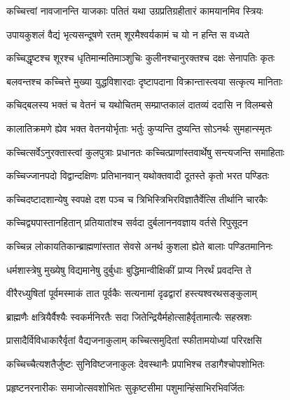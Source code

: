 \twolineshloka
{कच्चित्त्वां नावजानन्ति याजकाः पतितं यथा}
{उग्रप्रतिग्रहीतारं कामयानमिव स्त्रियः} %

\twolineshloka
{उपायकुशलं वैद्यं भृत्यसन्दूषणे रतम्}
{शूरमैश्वर्यकामं च यो न हन्ति स वध्यते} %

\twolineshloka
{कच्चिद्धृष्टश्च शूरश्च धृतिमान्मतिमाञ्शुचिः}
{कुलीनश्चानुरक्तश्च दक्षः सेनापतिः कृतः} %

\twolineshloka
{बलवन्तश्च कच्चित्ते मुख्या युद्धविशारदाः}
{दृष्टापदाना विक्रान्तास्त्वया सत्कृत्य मानिताः} %

\twolineshloka
{कचिद्बलस्य भक्तं च वेतनं च यथोचितम्}
{सम्प्राप्तकालं दातव्यं ददासि न विलम्बसे} %

\twolineshloka
{कालातिक्रमणे ह्येव भक्त वेतनयोर्भृताः}
{भर्तुः कुप्यन्ति दुष्यन्ति सोऽनर्थः सुमहान्स्मृतः} %

\twolineshloka
{कच्चित्सर्वेऽनुरक्तास्त्वां कुलपुत्राः प्रधानतः}
{कच्चित्प्राणांस्तवार्थेषु सन्त्यजन्ति समाहिताः} %

\twolineshloka
{कच्चिज्जानपदो विद्वान्दक्षिणः प्रतिभानवान्}
{यथोक्तवादी दूतस्ते कृतो भरत पण्डितः} %

\twolineshloka
{कच्चिदष्टादशान्येषु स्वपक्षे दश पञ्च च}
{त्रिभिस्त्रिभिरविज्ञातैर्वेत्सि तीर्थानि चारकैः} %

\twolineshloka
{कच्चिद्व्यपास्तानहितान् प्रतियातांश्च सर्वदा}
{दुर्बलाननवज्ञाय वर्तसे रिपुसूदन} %

\twolineshloka
{कच्चिन्न लोकायतिकान्ब्राह्मणांस्तात सेवसे}
{अनर्थ कुशला ह्येते बालाः पण्डितमानिनः} %

\twolineshloka
{धर्मशास्त्रेषु मुख्येषु विद्यमानेषु दुर्बुधाः}
{बुद्धिमान्वीक्षिकीं प्राप्य निरर्थं प्रवदन्ति ते} %

\twolineshloka
{वीरैरध्युषितां पूर्वमस्माकं तात पूर्वकैः}
{सत्यनामां दृढद्वारां हस्त्यश्वरथसङ्कुलाम्} %

\twolineshloka
{ब्राह्मणैः क्षत्रियैर्वैश्यैः स्वकर्मनिरतैः सदा}
{जितेन्द्रियैर्महोत्साहैर्वृतामात्यैः सहस्रशः} %

\twolineshloka
{प्रासादैर्विविधाकारैर्वृतां वैद्यजनाकुलाम्}
{कच्चित्समुदितां स्फीतामयोध्यां परिरक्षसि} %

\twolineshloka
{कच्चिच्चैत्यशतैर्जुष्टः सुनिविष्टजनाकुलः}
{देवस्थानैः प्रपाभिश्च तडागैश्चोपशोभितः} %

\twolineshloka
{प्रहृष्टनरनारीकः समाजोत्सवशोभितः}
{सुकृष्टसीमा पशुमान्हिंसाभिरभिवर्जितः} %

